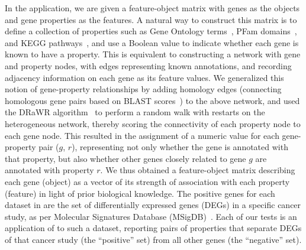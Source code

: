 In the \msig application,
we are given a feature-object
matrix with genes as the objects
and gene properties as the features.
A natural way to construct this matrix
is to define a collection of properties
such as Gene Ontology terms~\cite{gene2014gene},
PFam domains~\cite{finn2015pfam},
and KEGG pathways~\cite{kanehisa2016kegg},
and use a Boolean value
to indicate whether each gene is known to have a property.
This is equivalent to constructing a network
with gene and property nodes, with edges representing
known annotations, and recording adjacency information
on each gene as its feature values.
We generalized this notion of gene-property
relationships by adding homology edges
(connecting homologous gene pairs based on BLAST scores~\cite{altschul1990basic})
to the above network, and used the DRaWR algorithm~\cite{blatti2016characterizing}
to perform a random walk with restarts
on the heterogeneous network,
thereby scoring the connectivity of each property node
to each gene node.
This resulted in the assignment of a numeric value
for each gene-property pair ($g$, $r$),
representing not only whether the gene is
annotated with that property,
but also whether other genes closely
related to gene $g$ are annotated with property $r$.
We thus obtained a feature-object matrix describing
each gene (object) as a vector of its strength of
association with each property (feature)
in light of prior biological knowledge.
The positive genes for each dataset in \msig
are the set of differentially expressed genes (DEGs)
in a specific cancer study,
as per Molecular Signatures Database (MSigDB)~\cite{subramanian2005gene}.
Each of our tests is an application of
\genviz to such a dataset,
reporting pairs of properties
that separate DEGs of that cancer study (the ``positive'' set)
from all other genes (the ``negative'' set).

